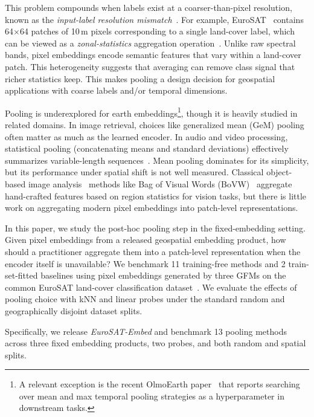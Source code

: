 \documentclass{article} %
\begin{document}
This problem compounds when labels exist at a coarser-than-pixel resolution, known as the \textit{input-label resolution mismatch}~\citep{workman2023handling}.
For example, EuroSAT~\citep{helber2019eurosat} contains 64$\times$64 patches of 10\,m pixels corresponding to a single land-cover label, which can be viewed as a \textit{zonal-statistics} aggregation operation~\citep{cressie2015statistics}.
Unlike raw spectral bands, pixel embeddings encode semantic features that vary within a land-cover patch.
This heterogeneity suggests that averaging can remove class signal that richer statistics keep.
This makes pooling a design decision for geospatial applications with coarse labels and/or temporal dimensions.

Pooling is underexplored for earth embeddings\footnote{A relevant exception is the recent OlmoEarth paper~\cite{herzog2025olmoearth} that reports searching over mean and max temporal pooling strategies as a hyperparameter in downstream tasks.}, though it is heavily studied in related domains.
In image retrieval, choices like generalized mean (GeM) pooling~\citep{radenovic2018gem} often matter as much as the learned encoder.
In audio and video processing, statistical pooling (concatenating means and standard deviations) effectively summarizes variable-length sequences~\citep{miech2017learnable}.
Mean pooling dominates for its simplicity, but its performance under spatial shift is not well measured.
Classical object-based image analysis~\citep{eo4geoobia} methods like Bag of Visual Words (BoVW)~\citep{csurka2004visual} aggregate hand-crafted features based on region statistics for vision tasks, but there is little work on aggregating modern pixel embeddings into patch-level representations.

In this paper, we study the post-hoc pooling step in the fixed-embedding setting.
Given pixel embeddings from a released geospatial embedding product, how should a practitioner aggregate them into a patch-level representation when the encoder itself is unavailable?
We benchmark 11 training-free methods and 2 train-set-fitted baselines using pixel embeddings generated by three GFMs on the common EuroSAT land-cover classification dataset~\cite{helber2019eurosat}.
We evaluate the effects of pooling choice with kNN and linear probes under the standard random and geographically disjoint dataset splits.

Specifically, we release \emph{EuroSAT-Embed} and benchmark 13 pooling methods across three fixed embedding products, two probes, and both random and spatial splits.
\end{document}
